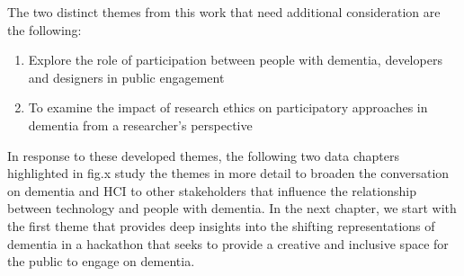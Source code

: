 The two distinct themes from this work that need additional consideration are the following:
\begin{enumerate}

    \item Explore the role of participation between people with dementia, developers and designers in public engagement 
    \item To examine the impact of research ethics on participatory approaches in dementia from a researcher's perspective
\end{enumerate}

In response to these developed themes, the following two data chapters highlighted in fig.x study the themes in more detail to broaden the conversation on dementia and HCI to other stakeholders that influence the relationship between technology and people with dementia. In the next chapter, we start with the first theme that provides deep insights into the shifting representations of dementia in a hackathon that seeks to provide a creative and inclusive space for the public to engage on dementia.
